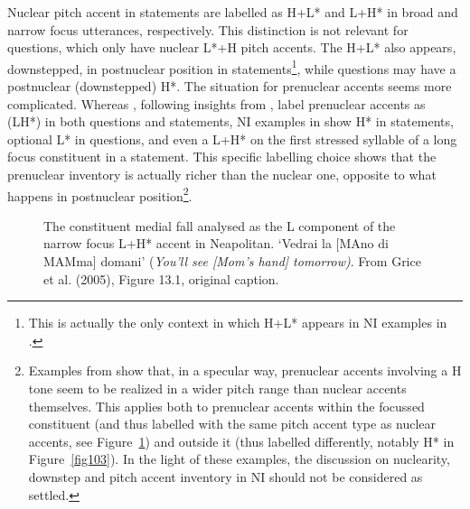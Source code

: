 Nuclear pitch accent in statements are labelled as H+L* and L+H* in broad and narrow focus utterances, respectively. This distinction is not relevant for questions, which only have nuclear L*+H pitch accents. The H+L* also appears, downstepped, in postnuclear position in statements\footnote{This is actually the only context in which H+L* appears in NI examples in \citet{grice2005strategy}.}, while questions may have a postnuclear (downstepped) H*. The situation for prenuclear accents seems more complicated. Whereas \citet{petrone2011tones}, following insights from \citet{prieto2005pitch}, label prenuclear accents as (LH*) in both questions and statements, NI examples in \citet{grice2005strategy} show H* in statements, optional L* in questions, and even a L+H* on the first stressed syllable of a long focus constituent in a statement. This specific labelling choice shows that the prenuclear inventory is actually richer than the nuclear one, opposite to what happens in postnuclear position\footnote{Examples from \citet{grice2005strategy} show that, in a specular way, prenuclear accents involving a H tone seem to be realized in a wider pitch range than nuclear accents themselves. This applies both to prenuclear accents within the focussed constituent (and thus labelled with the same pitch accent type as nuclear accents, see Figure~\ref{fig102}) and outside it (thus labelled differently, notably H* in Figure~\ref{fig103}). In the light of these examples, the discussion on nuclearity, downstep and pitch accent inventory in NI should not be considered as settled.}.

\begin{figure}
\centering
{}
\caption{The constituent medial fall analysed as the L component of the narrow focus L+H* accent in Neapolitan. `Vedrai la [MAno di MAMma] domani' (\textit{You'll see [Mom's hand] tomorrow)}. From Grice et al. (2005), Figure 13.1, original caption.}
\label{fig102}\end{figure}

